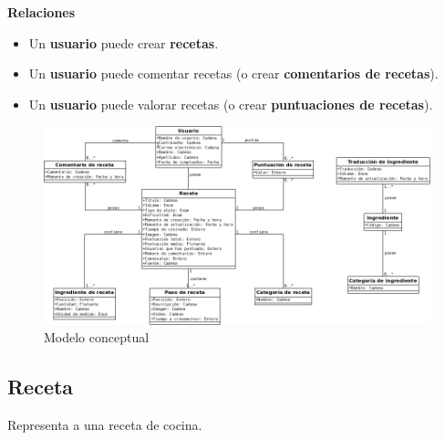 \textbf{Relaciones}
\begin{itemize}
\item Un \textbf{usuario} puede crear \textbf{recetas}.
\item Un \textbf{usuario} puede comentar recetas (o crear
\textbf{comentarios de recetas}).
\item Un \textbf{usuario} puede valorar recetas (o crear
\textbf{puntuaciones de recetas}).
\end{itemize}


\begin{figure}[H]
  \centering
  \includegraphics[width=\textwidth]{cap4/img/diagrama_clases_conceptuales}
  \caption{Modelo conceptual}
  \label{fig:modelo-conceptual}
\end{figure}

\subsection{Receta}

Representa a una receta de cocina.

